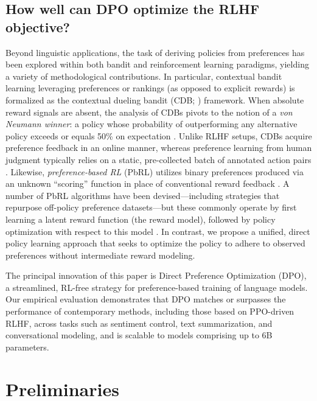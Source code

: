 \subsection{How well can DPO optimize the RLHF objective?}

Beyond linguistic applications, the task of deriving policies from preferences has been explored within both bandit and reinforcement learning paradigms, yielding a variety of methodological contributions. In particular, contextual bandit learning leveraging preferences or rankings (as opposed to explicit rewards) is formalized as the contextual dueling bandit (CDB; \cite{yue2012karmed,dudik2015contextual}) framework. When absolute reward signals are absent, the analysis of CDBs pivots to the notion of a \textit{von Neumann winner}: a policy whose probability of outperforming any alternative policy exceeds or equals 50\% on expectation \citep{dudik2015contextual}. Unlike RLHF setups, CDBs acquire preference feedback in an online manner, whereas preference learning from human judgment typically relies on a static, pre-collected batch of annotated action pairs \citep{yan2022human}. Likewise, \textit{preference-based RL} (PbRL) utilizes binary preferences produced via an unknown “scoring” function in place of conventional reward feedback \citep{BusaFekete2014,ruiz2023dueling}. A number of PbRL algorithms have been devised—including strategies that repurpose off-policy preference datasets—but these commonly operate by first learning a latent reward function (the reward model), followed by policy optimization with respect to this model \citep{jain2013learning,BusaFekete2014,christiano2017deep,sadigh2017active,kupcsik2018learning}. In contrast, we propose a unified, direct policy learning approach that seeks to optimize the policy to adhere to observed preferences without intermediate reward modeling.

The principal innovation of this paper is Direct Preference Optimization (DPO), a streamlined, RL-free strategy for preference-based training of language models. Our empirical evaluation demonstrates that DPO matches or surpasses the performance of contemporary methods, including those based on PPO-driven RLHF, across tasks such as sentiment control, text summarization, and conversational modeling, and is scalable to models comprising up to 6B parameters.

\section{Preliminaries}\label{section:prelims}

